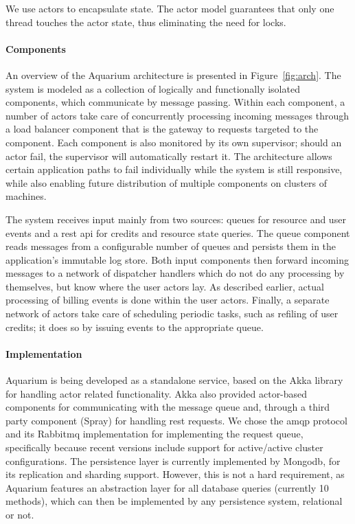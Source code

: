 We use actors to encapsulate state. The actor model guarantees that only one thread touches the actor state, thus eliminating the need for locks. 

\paragraph{Components} An overview of the Aquarium architecture is
presented in Figure~\ref{fig:arch}. The system is modeled as a
collection of logically and functionally isolated components, which
communicate by message passing. Within each component, a number of
actors take care of concurrently processing incoming messages through
a load balancer component that is the gateway to requests targeted to
the component. Each component is also monitored by its own supervisor;
should an actor fail, the supervisor will automatically restart it.
The architecture allows certain application paths to fail individually
while the system is still responsive, while also enabling future
distribution of multiple components on clusters of machines.

The system receives input mainly from two sources: queues for
resource and user events and a {\sc rest api} for credits and resource
state queries. The queue component reads messages from a configurable
number of queues and persists them in the application's immutable log
store. Both input components then forward incoming messages to a
network of dispatcher handlers which do not do any processing by
themselves, but know where the user actors lay. As described earlier,
actual processing of billing events is done within the user actors.
Finally, a separate network of actors take care of scheduling periodic
tasks, such as refiling of user credits; it does so by issuing events
to the appropriate queue.

\paragraph{Implementation}

Aquarium is being developed as a standalone service, based on the Akka library
for handling actor related functionality. Akka also provided actor-based
components for communicating with the message queue and, through a third party
component (Spray) for handling {\sc rest} requests. We chose the {\sc amqp}
protocol and its Rabbit{\sc mq} implementation for implementing the request
queue, specifically because recent versions include support for active/active
cluster configurations. The persistence layer is currently implemented by
Mongo{\sc db}, for its replication and sharding support. However, this is not a
hard requirement, as Aquarium features an abstraction layer for all database
queries (currently 10 methods), which can then be implemented by any
persistence system, relational or not.
